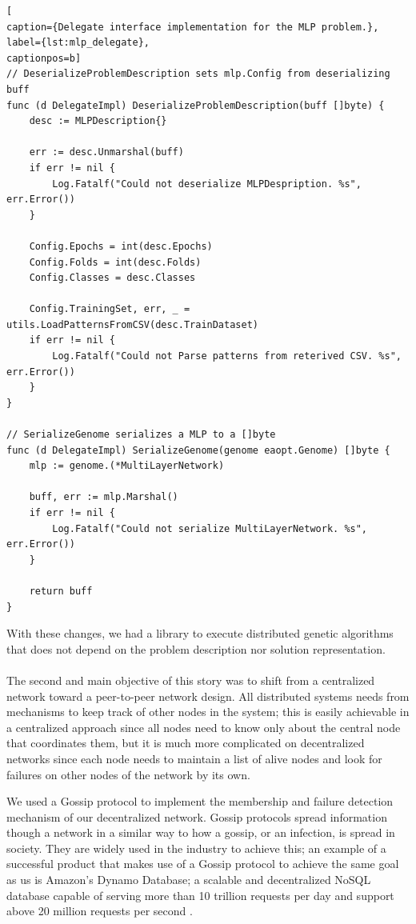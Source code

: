 \begin{lstlisting}[
caption={Delegate interface implementation for the MLP problem.},
label={lst:mlp_delegate},
captionpos=b]
// DeserializeProblemDescription sets mlp.Config from deserializing buff
func (d DelegateImpl) DeserializeProblemDescription(buff []byte) {
	desc := MLPDescription{}

	err := desc.Unmarshal(buff)
	if err != nil {
		Log.Fatalf("Could not deserialize MLPDespription. %s", err.Error())
	}

	Config.Epochs = int(desc.Epochs)
	Config.Folds = int(desc.Folds)
	Config.Classes = desc.Classes

	Config.TrainingSet, err, _ = utils.LoadPatternsFromCSV(desc.TrainDataset)
	if err != nil {
		Log.Fatalf("Could not Parse patterns from reterived CSV. %s", err.Error())
	}
}

// SerializeGenome serializes a MLP to a []byte
func (d DelegateImpl) SerializeGenome(genome eaopt.Genome) []byte {
	mlp := genome.(*MultiLayerNetwork)

	buff, err := mlp.Marshal()
	if err != nil {
		Log.Fatalf("Could not serialize MultiLayerNetwork. %s", err.Error())
	}

	return buff
}
\end{lstlisting}

With these changes, we had a library to execute distributed genetic algorithms that does not depend on the problem description nor solution representation.

\paragraph*{}
The second and main objective of this story was to shift from a centralized network toward a peer-to-peer network design.
All distributed systems needs from mechanisms to keep track of other nodes in the system; this is easily achievable in a centralized approach since all nodes need to know only about the central node that coordinates them, but it is much more complicated on decentralized networks since each node needs to maintain a list of alive nodes and look for failures on other nodes of the network by its own.

We used a Gossip protocol to implement the membership and failure detection mechanism of our decentralized network. Gossip protocols spread information though a network in a similar way to how a gossip, or an infection, is spread in society. They are widely used in the industry to achieve this; an example of a successful product that makes use of a Gossip protocol to achieve the same goal as us is Amazon's Dynamo Database\cite{dynamo_paper}; a scalable and decentralized NoSQL database capable of serving more than 10 trillion requests per day and support above 20 million requests per second \cite{dynamo_web}.

